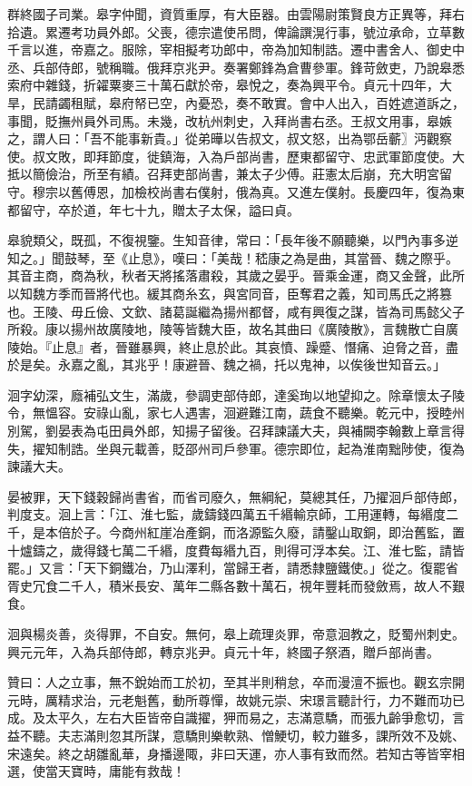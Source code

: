 \begin{pinyinscope}
 群終國子司業。皋字仲聞，資質重厚，有大臣器。由雲陽尉策賢良方正異等，拜右拾遺。累遷考功員外郎。父喪，德宗遣使吊問，俾論譔滉行事，號泣承命，立草數千言以進，帝嘉之。服除，宰相擬考功郎中，帝為加知制誥。遷中書舍人、御史中丞、兵部侍郎，號稱職。俄拜京兆尹。奏署鄭鋒為倉曹參軍。鋒苛斂吏，乃說皋悉索府中雜錢，折糴粟麥三十萬石獻於帝，皋悅之，奏為興平令。貞元十四年，大旱，民請蠲租賦，皋府帑已空，內憂恐，奏不敢實。會中人出入，百姓遮道訴之，事聞，貶撫州員外司馬。未幾，改杭州刺史，入拜尚書右丞。王叔文用事，皋嫉之，謂人曰：「吾不能事新貴。」從弟曄以告叔文，叔文怒，出為鄂岳蘄〗沔觀察使。叔文敗，即拜節度，徙鎮海，入為戶部尚書，歷東都留守、忠武軍節度使。大抵以簡儉治，所至有績。召拜吏部尚書，兼太子少傅。莊憲太后崩，充大明宮留守。穆宗以舊傅恩，加檢校尚書右僕射，俄為真。又進左僕射。長慶四年，復為東都留守，卒於道，年七十九，贈太子太保，謚曰貞。



 皋貌類父，既孤，不復視鑒。生知音律，常曰：「長年後不願聽樂，以門內事多逆知之。」聞鼓琴，至《止息》，嘆曰：「美哉！嵇康之為是曲，其當晉、魏之際乎。其音主商，商為秋，秋者天將搖落肅殺，其歲之晏乎。晉乘金運，商又金聲，此所以知魏方季而晉將代也。緩其商糸玄，與宮同音，臣奪君之義，知司馬氏之將篡也。王陵、毋丘儉、文欽、諸葛誕繼為揚州都督，咸有興復之謀，皆為司馬懿父子所殺。康以揚州故廣陵地，陵等皆魏大臣，故名其曲曰《廣陵散》，言魏散亡自廣陵始。『止息』者，晉雖暴興，終止息於此。其哀憤、躁蹙、憯痛、迫脅之音，盡於是矣。永嘉之亂，其兆乎！康避晉、魏之禍，托以鬼神，以俟後世知音云。」



 洄字幼深，廕補弘文生，滿歲，參調吏部侍郎，達奚珣以地望抑之。除章懷太子陵令，無慍容。安祿山亂，家七人遇害，洄避難江南，蔬食不聽樂。乾元中，授睦州別駕，劉晏表為屯田員外郎，知揚子留後。召拜諫議大夫，與補闕李翰數上章言得失，擢知制誥。坐與元載善，貶邵州司戶參軍。德宗即位，起為淮南黜陟使，復為諫議大夫。



 晏被罪，天下錢穀歸尚書省，而省司廢久，無綱紀，莫總其任，乃擢洄戶部侍郎，判度支。洄上言：「江、淮七監，歲鑄錢四萬五千緡輸京師，工用運轉，每緡度二千，是本倍於子。今商州紅崖冶產銅，而洛源監久廢，請鑿山取銅，即治舊監，置十爐鑄之，歲得錢七萬二千緡，度費每緡九百，則得可浮本矣。江、淮七監，請皆罷。」又言：「天下銅鐵冶，乃山澤利，當歸王者，請悉隸鹽鐵使。」從之。復罷省胥史冗食二千人，積米長安、萬年二縣各數十萬石，視年豐耗而發斂焉，故人不艱食。



 洄與楊炎善，炎得罪，不自安。無何，皋上疏理炎罪，帝意洄教之，貶蜀州刺史。興元元年，入為兵部侍郎，轉京兆尹。貞元十年，終國子祭酒，贈戶部尚書。



 贊曰：人之立事，無不銳始而工於初，至其半則稍怠，卒而漫澶不振也。觀玄宗開元時，厲精求治，元老魁舊，動所尊憚，故姚元崇、宋璟言聽計行，力不難而功已成。及太平久，左右大臣皆帝自識擢，狎而易之，志滿意驕，而張九齡爭愈切，言益不聽。夫志滿則忽其所謀，意驕則樂軟熟、憎鯁切，較力雖多，課所效不及姚、宋遠矣。終之胡雛亂華，身播邊陬，非曰天運，亦人事有致而然。若知古等皆宰相選，使當天寶時，庸能有救哉！



\end{pinyinscope}